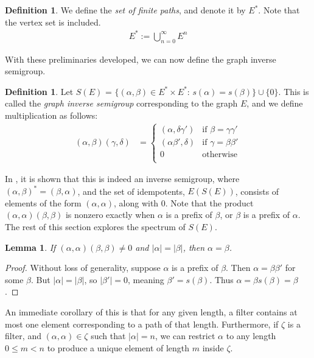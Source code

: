 \documentclass[12pt]{article}
\newtheorem{lemma}[theorem]{Lemma}
\theoremstyle{definition}
\newtheorem{definition}[theorem]{Definition}
\begin{document}
\begin{definition}
    We define the \emph{set of finite paths}, and denote it by $E^*$. Note that the vertex set is included.
    \begin{align*}
        E^* := \bigcup_{n=0}^\infty E^n
    \end{align*}
\end{definition}

With these preliminaries developed, we can now define the graph inverse semigroup.

\begin{definition}
    Let $S(E)$ = $\{(\alpha, \beta) \in E^* \times E^*$: $s(\alpha) = s(\beta)\} \cup \{0\}$. This is called
    the \emph{graph inverse semigroup} corresponding to the graph $E$, and we define multiplication as follows:
    \begin{align*}
        (\alpha, \beta)(\gamma, \delta) &= 
        \begin{cases}
            (\alpha, \delta \gamma') &\text{if } \beta = \gamma \gamma' \\
            (\alpha \beta', \delta) &\text{if } \gamma = \beta \beta' \\
            0 &\text{otherwise} \\
        \end{cases}
    \end{align*}
\end{definition}

In \parencite[Section 3]{cheaney}, it is shown that this is indeed an inverse semigroup,
where $(\alpha, \beta)^* = (\beta, \alpha)$, and the set of idempotents, $E(S(E))$, 
consists of elements of the form $(\alpha, \alpha)$, along with $0$.
Note that the product $(\alpha, \alpha)(\beta, \beta)$ is nonzero exactly when $\alpha$ is a prefix of $\beta$, or $\beta$ is a prefix of $\alpha$.
The rest of this section explores the spectrum of $S(E)$.

\begin{lemma} If $(\alpha, \alpha)(\beta, \beta) \neq 0$ and $|\alpha| = |\beta|$, then $\alpha = \beta$. \end{lemma}
\begin{proof}
    Without loss of generality, suppose $\alpha$ is a prefix of $\beta$. Then $\alpha = \beta \beta'$ for some $\beta$. But
    $|\alpha| = |\beta|$, so $|\beta'| = 0$, meaning $\beta' = s(\beta)$. Thus $\alpha = \beta s(\beta) = \beta$.
\end{proof}
An immediate corollary of this is that for any given length, a filter contains at most one element corresponding
to a path of that length. Furthermore, if $\zeta$ is a filter, and $(\alpha, \alpha) \in \zeta$ such that $|\alpha| = n$,
we can restrict $\alpha$ to any length $0 \leq m < n$ to produce a unique element of length $m$ inside $\zeta$.
\end{document}
